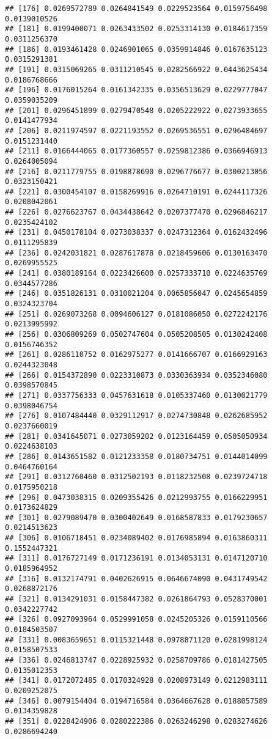 \documentclass[
]{article}
\begin{document}
\begin{verbatim}
## [176] 0.0269572789 0.0264841549 0.0229523564 0.0159756498 0.0139010526
## [181] 0.0199400071 0.0263433502 0.0253314130 0.0184617359 0.0311256370
## [186] 0.0193461428 0.0246901065 0.0359914846 0.0167635123 0.0315291381
## [191] 0.0315069265 0.0311210545 0.0282566922 0.0443625434 0.0186768666
## [196] 0.0176015264 0.0161342335 0.0356513629 0.0229777047 0.0359035209
## [201] 0.0296451899 0.0279470548 0.0205222922 0.0273933655 0.0141477934
## [206] 0.0211974597 0.0221193552 0.0269536551 0.0296484697 0.0151231440
## [211] 0.0166444065 0.0177360557 0.0259812386 0.0366946913 0.0264005094
## [216] 0.0211779755 0.0198878690 0.0296776677 0.0300213056 0.0323150421
## [221] 0.0300454107 0.0158269916 0.0264710191 0.0244117326 0.0208042061
## [226] 0.0276623767 0.0434438642 0.0207377470 0.0296846217 0.0235424102
## [231] 0.0450170104 0.0273038337 0.0247312364 0.0162432496 0.0111295839
## [236] 0.0242031821 0.0287617878 0.0218459606 0.0130163470 0.0269955525
## [241] 0.0380189164 0.0223426600 0.0257333710 0.0224635769 0.0344577286
## [246] 0.0351826131 0.0310021204 0.0065856047 0.0245654859 0.0324323704
## [251] 0.0269073268 0.0094606127 0.0181086050 0.0272242176 0.0213995992
## [256] 0.0306809269 0.0502747604 0.0505208505 0.0130242408 0.0156746352
## [261] 0.0286110752 0.0162975277 0.0141666707 0.0166929163 0.0244323048
## [266] 0.0154372890 0.0223310873 0.0330363934 0.0352346080 0.0398570845
## [271] 0.0337756333 0.0457631618 0.0105337460 0.0130021779 0.0398046754
## [276] 0.0107484440 0.0329112917 0.0274730848 0.0262685952 0.0237660019
## [281] 0.0341645071 0.0273059202 0.0123164459 0.0505050934 0.0224638103
## [286] 0.0143651582 0.0121233358 0.0180734751 0.0144014099 0.0464760164
## [291] 0.0312760460 0.0312502193 0.0118232508 0.0239724718 0.0175950218
## [296] 0.0473038315 0.0209355426 0.0212993755 0.0166229951 0.0173624829
## [301] 0.0279089470 0.0300402649 0.0168587833 0.0179230657 0.0214513623
## [306] 0.0106718451 0.0234089402 0.0176985894 0.0163860311 0.1552447321
## [311] 0.0176727149 0.0171236191 0.0134053131 0.0147120710 0.0185964952
## [316] 0.0132174791 0.0402626915 0.0646674090 0.0431749542 0.0268872176
## [321] 0.0134291031 0.0158447382 0.0261864793 0.0528370001 0.0342227742
## [326] 0.0927093964 0.0529991058 0.0245205326 0.0159110566 0.0184503507
## [331] 0.0083659651 0.0115321448 0.0978871120 0.0281998124 0.0158507533
## [336] 0.0246813747 0.0228925932 0.0258709786 0.0181427505 0.0135012353
## [341] 0.0172072485 0.0170324928 0.0208973149 0.0212983111 0.0209252075
## [346] 0.0079154404 0.0194716584 0.0364667628 0.0188057589 0.0134359828
## [351] 0.0228424906 0.0280222386 0.0263246298 0.0283274626 0.0286694240

\end{verbatim}
\end{document}
